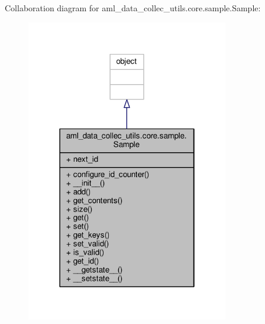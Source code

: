 Collaboration diagram for aml\-\_\-data\-\_\-collec\-\_\-utils.\-core.\-sample.\-Sample\-:\nopagebreak
\begin{figure}[H]
\begin{center}
\leavevmode
\includegraphics[width=250pt]{classaml__data__collec__utils_1_1core_1_1sample_1_1_sample__coll__graph}
\end{center}
\end{figure}
